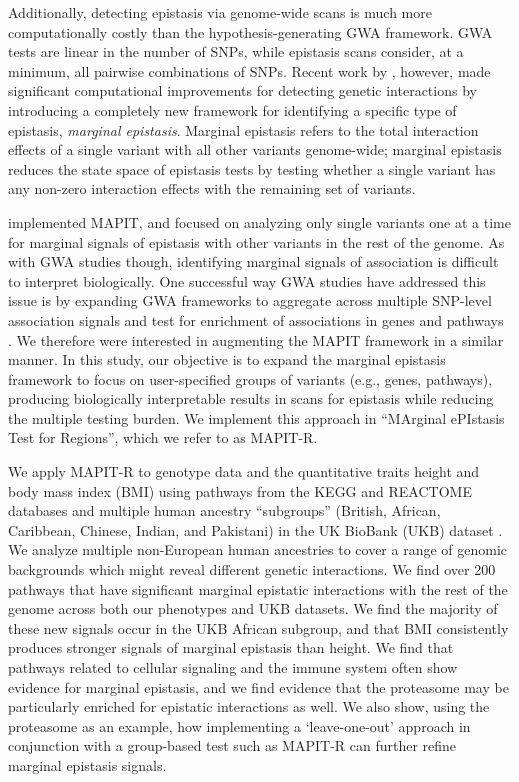 \documentclass[12pt,a4paper]{article}
\begin{document}
Additionally, detecting epistasis via genome-wide scans is much more computationally costly than the hypothesis-generating GWA framework. GWA tests are linear in the number of SNPs, while epistasis scans consider, at a minimum, all pairwise combinations of SNPs. Recent work by \citet{Crawford2017a}, however, made significant computational improvements for detecting genetic interactions by introducing a completely new framework for identifying a specific type of epistasis, \textit{marginal epistasis}. %
Marginal epistasis refers to the total interaction effects of a single variant with all other variants genome-wide; marginal epistasis reduces the state space of epistasis tests by testing whether a single variant has any non-zero interaction effects with the remaining set of variants. 

\citet{Crawford2017a} implemented MAPIT, and focused on analyzing only single variants one at a time for marginal signals of epistasis with other variants in the rest of the genome. As with GWA studies though, identifying marginal signals of association is difficult to interpret biologically. One successful way GWA studies have addressed this issue is by expanding GWA frameworks to aggregate across multiple SNP-level association signals and test for enrichment of associations in genes and pathways \citep{Subramanian2005,Cantor2010,Wang2010,Lee2012,Carbonetto2013,Mooney2014,Gamazon2015,de2016,Nakka2016,Zhu2018,Sun2019,Cheng2020}. We therefore were interested in augmenting the MAPIT framework in a similar manner. In this study, our objective is to expand the marginal epistasis framework to focus on user-specified groups of variants (e.g., genes, pathways), producing biologically interpretable results in scans for epistasis while reducing the multiple testing burden. We implement this approach in ``MArginal ePIstasis Test for Regions'', which we refer to as MAPIT-R.

We apply MAPIT-R to genotype data and the quantitative traits height and body mass index (BMI) using pathways from the KEGG and REACTOME databases \citep{Liberzon2011} and multiple human ancestry ``subgroups'' (British, African, Caribbean, Chinese, Indian, and Pakistani)  in the UK BioBank (UKB) dataset \citep{Sudlow2015}. We analyze multiple non-European human ancestries to cover a range of genomic backgrounds which might reveal different genetic interactions. We find over 200 pathways that have significant marginal epistatic interactions with the rest of the genome across both our phenotypes and UKB datasets. We find the majority of these new signals occur in the UKB African subgroup, and that BMI consistently produces stronger signals of marginal epistasis than height. We find that pathways related to cellular signaling and the immune system often show evidence for marginal epistasis, and we find evidence that the proteasome may be particularly enriched for epistatic interactions as well. We also show, using the proteasome as an example, how implementing a `leave-one-out' approach in conjunction with a group-based test such as MAPIT-R can further refine marginal epistasis signals.   
\end{document}
